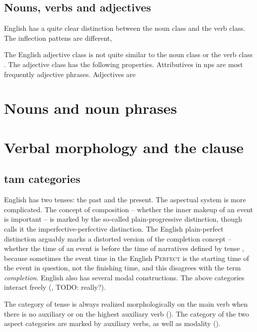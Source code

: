 \documentclass[UTF8, a4paper, oneside, scheme=plain]{ctexrep}
\newcommand*{\citesec}[1]{\S~{#1}}
\newcommand*{\citepage}[1]{pp.~{#1}}
\newcommand*{\term}[1]{\emph{#1}}
\newcommand{\category}[1]{\textsc{#1}}
\begin{document}
\subsection{Nouns, verbs and adjectives}

English has a quite clear distinction between the noun class and the verb class.
The inflection pattens are different, 

The English adjective class is not quite similar to the noun class or the verb class 
\citep[\citepage{73}]{dixon2010basic2}.
The adjective class has the following properties.
Attributives in \acs{np}s are most frequently adjective phrases.
Adjectives are 

\section{Nouns and noun phrases}

\section{Verbal morphology and the clause}

\subsection{\acs{tam} categories}

English has two tenses: the past and the present.
The aspectual system is more complicated. 
The concept of composition 
-- whether the inner makeup of an event is important \citep[\citesec{19.10}]{dixon2012basic3} -- 
is marked by the so-called plain-progressive distinction,
though \citep{dixon2012basic3} calls it the imperfective-perfective distinction.
The English plain-perfect distinction arguably marks 
a distorted version of the completion concept 
-- whether the time of an event is before the time of narratives defined by tense 
\citep[\citesec{19.7}]{dixon2012basic3},
because sometimes the event time in the English \category{Perfect} 
is the starting time of the event in question,
not the finishing time,
and this disagrees with the term \term{completion}.
English also has several modal constructions.
The above categories interact freely (, TODO: really?).

The category of tense is always realized morphologically 
on the main verb when there is no auxiliary 
or on the highest auxiliary verb ().
The category of the two aspect categories are marked by auxiliary verbs, 
as well as modality (). 
\end{document}
